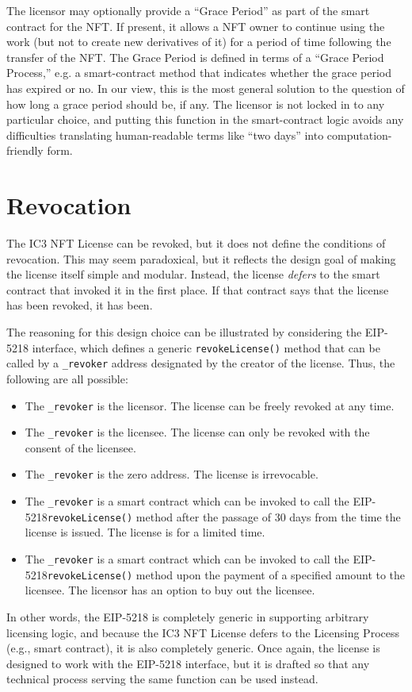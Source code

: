 \documentclass{article}
\newcommand{\eiplicense}{EIP-5218\xspace}
\newcommand{\iccclicense}{IC3 NFT License\xspace}
\renewcommand{\code}[1]{\colorbox{light-gray}{\texttt{#1}}}
\begin{document}
The licensor may optionally provide a ``Grace Period'' as part of the smart contract for the NFT. If present, it allows a NFT owner to continue using the work (but not to create new derivatives of it) for a period of time following the transfer of the NFT. The Grace Period is defined in terms of a ``Grace Period Process,'' e.g. a smart-contract method that indicates whether the grace period has expired or no. In our view, this is the most general solution to the question of how long a grace period should be, if any. The licensor is not locked in to any particular choice, and putting this function in the smart-contract logic avoids any difficulties translating human-readable terms like ``two days'' into computation-friendly form.

\section{Revocation}

The \iccclicense can be revoked, but it does not define the conditions of revocation. This may seem paradoxical, but it reflects the design goal of making the license itself simple and modular. Instead, the license \emph{defers} to the smart contract that invoked it in the first place. If that contract says that the license has been revoked, it has been. 

The reasoning for this design choice can be illustrated by considering the \eiplicense interface, which defines a generic \code{revokeLicense()} method that can be called by a \code{\_revoker} address designated by the creator of the license. Thus, the following are all possible:
\begin{itemize}
\item The \code{\_revoker} is the licensor. The license can be freely revoked at any time.
\item The \code{\_revoker} is the licensee. The license can only be revoked with the consent of the licensee.
\item The \code{\_revoker} is the zero address. The license is irrevocable.
\item The \code{\_revoker} is a smart contract which can be invoked to call the \eiplicense \code{revokeLicense()} method after the passage of 30 days from the time the license is issued. The license is for a limited time.
\item The \code{\_revoker} is a smart contract which can be invoked to call the \eiplicense \code{revokeLicense()} method upon the payment of a specified amount to the licensee. The licensor has an option to buy out the licensee.
\end{itemize}
In other words, the \eiplicense is completely generic in supporting arbitrary licensing logic, and because the \iccclicense defers to the Licensing Process (e.g., smart contract), it is also completely generic. Once again, the license is designed to work with the \eiplicense interface, but it is drafted so that any technical process serving the same function can be used instead.
\end{document}
